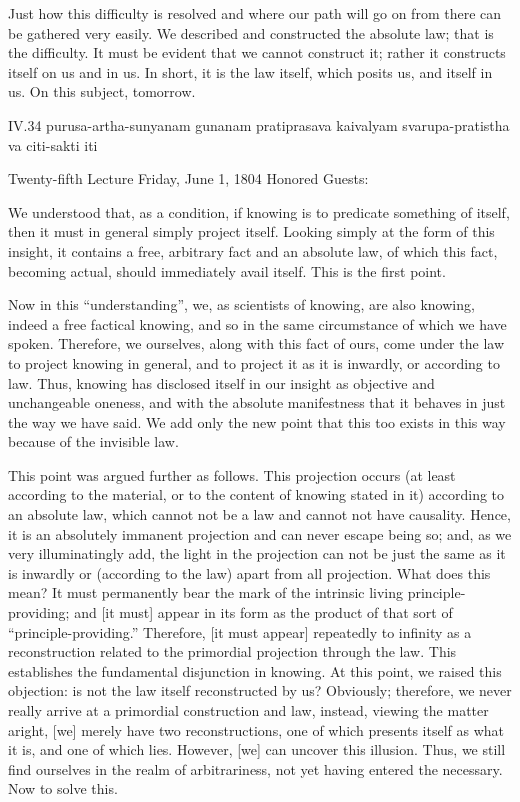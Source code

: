 Just how this difficulty is resolved
and where our path will go on from there
can be gathered very easily.
We described and constructed the absolute law;
that is the difficulty.
It must be evident that we cannot construct it;
rather it constructs itself on us and in us.
In short, it is the law itself,
which posits us, and itself in us.
On this subject, tomorrow.

IV.34
purusa-artha-sunyanam gunanam pratiprasava kaivalyam
svarupa-pratistha va citi-sakti iti

Twenty-fifth Lecture
Friday, June 1, 1804
Honored Guests:

We understood that, as a condition,
if knowing is to predicate something of itself,
then it must in general simply project itself.
Looking simply at the form of this insight,
it contains a free, arbitrary fact and an absolute law,
of which this fact, becoming actual,
should immediately avail itself.
This is the first point.

Now in this “understanding”, we, as scientists of knowing,
are also knowing, indeed a free factical knowing,
and so in the same circumstance of which we have spoken.
Therefore, we ourselves, along with this fact of ours,
come under the law to project knowing in general,
and to project it as it is inwardly, or according to law.
Thus, knowing has disclosed itself in our insight
as objective and unchangeable oneness,
and with the absolute manifestness that
it behaves in just the way we have said.
We add only the new point that this too
exists in this way because of the invisible law.

This point was argued further as follows.
This projection occurs
(at least according to the material,
or to the content of knowing stated in it)
according to an absolute law,
which cannot not be a law
and cannot not have causality.
Hence, it is an absolutely immanent projection
and can never escape being so;
and, as we very illuminatingly add,
the light in the projection can not be just
the same as it is inwardly or
(according to the law)
apart from all projection.
What does this mean?
It must permanently bear the mark of
the intrinsic living principle-providing;
and [it must] appear in its form as
the product of that sort of “principle-providing.”
Therefore, [it must appear] repeatedly to infinity
as a reconstruction related to
the primordial projection through the law.
This establishes the fundamental disjunction in knowing.
At this point, we raised this objection:
is not the law itself reconstructed by us?
Obviously; therefore, we never really arrive
at a primordial construction and law,
instead, viewing the matter aright,
[we] merely have two reconstructions,
one of which presents itself as what it is,
and one of which lies.
However, [we] can uncover this illusion.
Thus, we still find ourselves in
the realm of arbitrariness,
not yet having entered the necessary.
Now to solve this.

